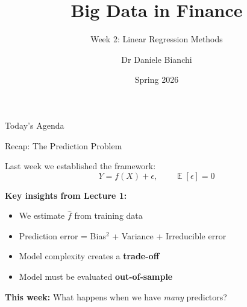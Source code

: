 \documentclass[10pt]{beamer}
\title{Big Data in Finance}
\subtitle{Week 2: Linear Regression Methods}
\author{Dr Daniele Bianchi}
\date{Spring 2026}
\newcommand{\highlight}[1]{\textcolor{AccentOrange}{\textbf{#1}}}
\DeclareMathOperator{\E}{\mathbb{E}}
\begin{document}
\AtBeginSection[]{
  \begin{frame}[plain]
    \vfill
    \begin{center}
      {\Large\color{ThemeBlue}\insertsection}
    \end{center}
    \vfill
  \end{frame}
}


\begin{frame}[plain]
  \titlepage
\end{frame}



\begin{frame}{Today's Agenda}
  \tableofcontents
\end{frame}


\begin{frame}{Recap: The Prediction Problem}

Last week we established the framework:
\[
Y = f(X) + \epsilon, \qquad \E[\epsilon] = 0
\]

\vspace{0.5em}
\textbf{Key insights from Lecture 1:}
\begin{itemize}
  \item We estimate $\widehat{f}$ from training data
  \item Prediction error = Bias$^2$ + Variance + Irreducible error
  \item Model complexity creates a \highlight{trade-off}
  \item Model must be evaluated \highlight{out-of-sample}
\end{itemize}

\vspace{1em}
\textbf{This week:} What happens when we have \emph{many} predictors?

\end{frame}

\end{document}
